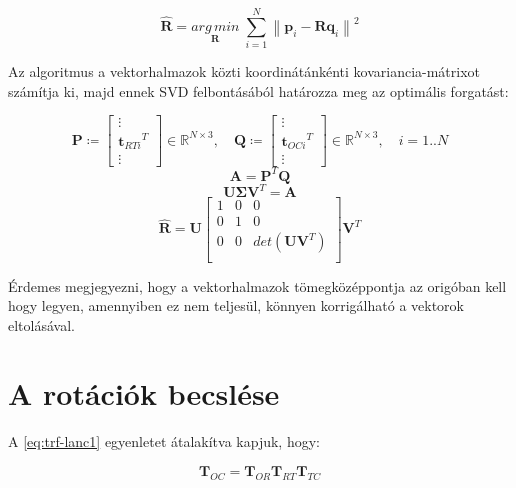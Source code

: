 \begin{equation}
\hat{\mathbf{R}} = \underset{\mathbf{R}}{ arg\,min} \; \sum_{i=1}^N \left\lVert\mathbf{p}_i	- \mathbf{R} \mathbf{q}_i\right\rVert^2
\end{equation}
	
	Az algoritmus a vektorhalmazok közti koordinátánkénti kovariancia-mátrixot számítja ki, majd ennek SVD felbontásából határozza meg az optimális forgatást:
	
	\begin{equation}
	\label{eq:kabsch-bigmat}
	\mathbf{P} \coloneqq \left[ \begin{matrix}
		\vdots \\
		{\mathbf{t}_{RTi}}^T \\
		\vdots
		\end{matrix} \right] \in \mathbb{R}^{N \times 3} , \quad
	\mathbf{Q} \coloneqq \left[ \begin{matrix}
		\vdots \\
		{\mathbf{t}_{OCi}}^T \\
		\vdots
		\end{matrix} \right] \in \mathbb{R}^{N \times 3} , \quad
		i = 1..N
	\end{equation}
	\begin{equation}
	\mathbf{A} = \mathbf{P}^T\mathbf{Q}
	\end{equation}
	\begin{equation}
	\mathbf{U \Sigma V}^T = \mathbf{A}
	\end{equation}
	\begin{equation}
	\hat{\mathbf{R}} = \mathbf{U}\left[
\begin{matrix}
1 & 0 & 0 \\
0 & 1 & 0 \\
0 & 0 & det(\mathbf{UV}^T) \\
\end{matrix}
	 \right]\mathbf{V}^T
	\end{equation}
	
	Érdemes megjegyezni, hogy a vektorhalmazok tömegközéppontja az origóban kell hogy legyen, amennyiben ez nem teljesül, könnyen korrigálható a vektorok eltolásával.
	
	\section{A rotációk becslése}
	A \eqref{eq:trf-lanc1} egyenletet átalakítva kapjuk, hogy:
	
	\begin{equation}
	\label{eq:trf-lanc2}
	\mathbf{T}_{OC} = \mathbf{T}_{OR}\mathbf{T}_{RT}\mathbf{T}_{TC}
	\end{equation}
	
